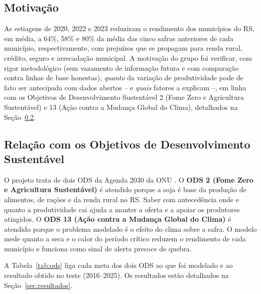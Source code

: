 \documentclass[12pt]{article}
\begin{document}
\subsection{Motivação}

As estiagens de 2020, 2022 e 2023 reduziram o rendimento dos municípios do
RS, em média, a 64\%, 58\% e 80\% da média das cinco safras anteriores de
cada município, respectivamente, com prejuízos que se propagam para renda rural, crédito,
seguro e arrecadação municipal. A motivação do grupo foi verificar,
com rigor metodológico (sem vazamento de informação futura e com
comparação contra linhas de base honestas), \emph{quanto} da variação de
produtividade pode de fato ser antecipada com dados abertos -- e
\emph{quais} fatores a explicam --, em linha com os Objetivos de
Desenvolvimento Sustentável 2 (Fome Zero e Agricultura Sustentável) e 13
(Ação contra a Mudança Global do Clima), detalhados na
Seção~\ref{sec:ods}.

\subsection{Relação com os Objetivos de Desenvolvimento Sustentável}
\label{sec:ods}

O projeto trata de dois ODS da Agenda 2030 da ONU \cite{onu2015}. O
\textbf{ODS 2 (Fome Zero e Agricultura Sustentável)} é atendido porque a
soja é base da produção de alimentos, de rações e da renda rural no RS.
Saber com antecedência onde e quanto a produtividade cai ajuda a manter a
oferta e a apoiar os produtores atingidos. O \textbf{ODS 13 (Ação contra a
Mudança Global do Clima)} é atendido porque o problema modelado é o efeito
do clima sobre a safra. O modelo mede quanto a seca e o calor do período
crítico reduzem o rendimento de cada município e funciona como sinal de
alerta precoce de quebra.

A Tabela~\ref{tab:ods} liga cada meta dos dois ODS ao que foi modelado e ao
resultado obtido no teste (2016--2025). Os resultados estão detalhados na
Seção~\ref{sec:resultados}.
\end{document}
